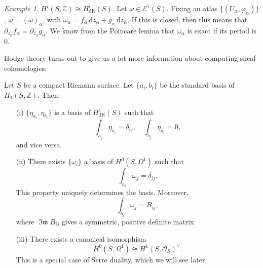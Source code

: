 \documentclass[a4paper]{report}
\theoremstyle{definition}
\theoremstyle{remark}
\theoremstyle{proposition}
\theoremstyle{conjecture}
\theoremstyle{lemma}
\theoremstyle{corollary}
\theoremstyle{exercise}
\theoremstyle{example}
\newtheorem{example}{Example}
\newcommand{\C}{\mathbb{C}}
\newcommand{\mcal}{\mathcal}
\newcommand{\diff}{\,\mathrm{d}}
\newcommand{\on}{\operatorname}
\begin{document}
\begin{example}
    $H^i(S,\C) \cong H^i_{\on{dR}}(S)$.
    Let $\omega \in \mcal{E}^1(S)$. Fixing an atlas $\lbrace (U_\alpha,\varphi_\alpha)\rbrace$, 
    $\omega = (\omega)_{\alpha}$, with 
    $\omega_\alpha = f_\alpha \diff z_\alpha + g_\alpha \diff\overline{z_\alpha}$.
    If this is closed, then this means that 
    $\partial_{\overline{z_\alpha}}f_\alpha = \partial_{z_\alpha}g_\alpha$.
    We know from the Poincare lemma that $\omega_\alpha$ is exact 
    if its period is $0$.
\end{example}

Hodge theory turns out to give us a lot more information about computing
sheaf cohomologies:

\begin{theorem}
    Let $S$ be a compact Riemann surface. Let $\lbrace a_i,b_i\rbrace$
    be the standard basis of $H_1(S,\mathbb{Z})$. Then:
    \begin{itemize}
        \item[(i)] $\lbrace \eta_{a_i},\eta_{b_i}\rbrace$ is a basis of 
            $H^1_{\on{dR}}(S)$ such that 
            $$\int_{a_j}\eta_{a_i} = \delta_{ij},\quad \int_{b_j}\eta_{a_i}=0,$$
            and vice versa.
        \item[(ii)] There exists $\lbrace \omega_i\rbrace$ a basis 
            of $H^0(S,\Omega^1)$ such that 
            $$\int_{a_i}\omega_j = \delta_{ij}.$$
            This property uniquely determines the basis. 
            Moreover,
            $$\int_{b_i}\omega_j = B_{ij},$$
            where $\on{\mathfrak{Im}}B_{ij}$ gives a symmetric, positive definite matrix.
        \item[(iii)]
            There exists a canonical isomorphism
            $$H^0(S,\Omega^1) \cong H^1(S,\mcal{O}_S)^\vee.$$
            This is a special case of Serre duality, which we will see later.
    \end{itemize}
\end{theorem}
\end{document}
